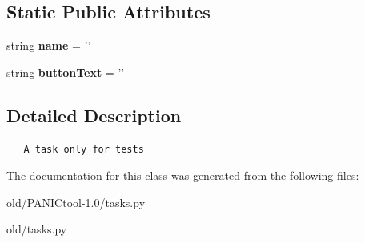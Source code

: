 \subsection*{Static Public Attributes}
\begin{CompactItemize}
\item 
string \textbf{name} = '{}'\label{classtasks_1_1test2_6f30c5afb4d538f7046428a1112db228}

\item 
string \textbf{button\-Text} = '{}'\label{classtasks_1_1test2_ff9a60ffbce17d2858d785d46fb37d64}

\end{CompactItemize}


\subsection{Detailed Description}


\footnotesize\begin{verbatim}
   A task only for tests
\end{verbatim}
\normalsize
 



The documentation for this class was generated from the following files:\begin{CompactItemize}
\item 
old/PANICtool-1.0/tasks.py\item 
old/tasks.py\end{CompactItemize}
